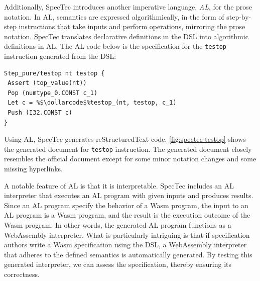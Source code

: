 Additionally, SpecTec introduces another imperative language, \textit{AL}, for
the prose notation.
In AL, semantics are expressed algorithmically, in the form of step-by-step
instructions that take inputs and perform operations, mirroring the prose notation.
SpecTec translates declarative definitions in the DSL into algorithmic
definitions in AL.
The AL code below is the specification for the \texttt{testop} instruction
generated from the DSL:
\begin{lstlisting}[escapechar=\%]
Step_pure/testop nt testop {
 Assert (top_value(nt))
 Pop (numtype_0.CONST c_1)
 Let c = %$\dollarcode$%testop_(nt, testop, c_1)
 Push (I32.CONST c)
}
\end{lstlisting}
Using AL, SpecTec generates reStructuredText code.
\cref{fig:spectec-testop} shows the generated document for \texttt{testop}
instruction.
The generated document closely resembles the official document except for some
minor notation changes and some missing hyperlinks.


A notable feature of AL is that it is interpretable.
SpecTec includes an AL interpreter that executes an AL program with given inputs
and produces results.
Since an AL program specify the behavior of a Wasm program, the input to an AL
program is a Wasm program, and the result is the execution outcome of the Wasm
program.
In other words, the generated AL program functions as a WebAssembly interpreter.
What is particularly intriguing is that if specification authors write a Wasm
specification using the DSL, a WebAssembly interpreter that adheres to the
defined semantics is automatically generated.
By testing this generated interpreter, we can assess the specification,
thereby ensuring its correctness.

